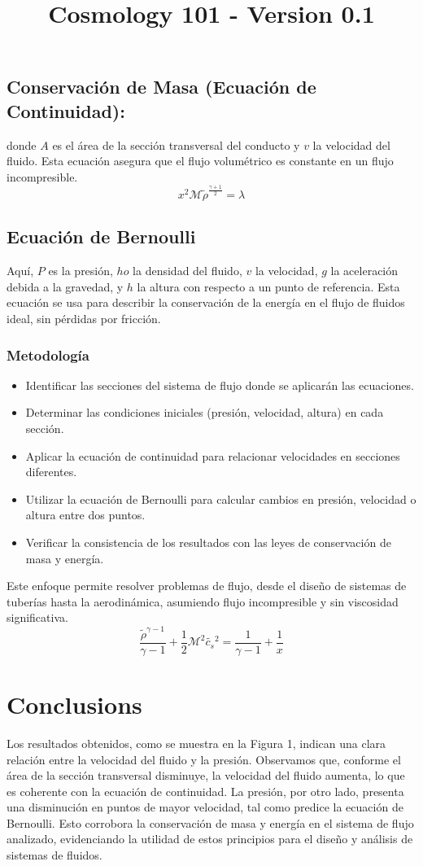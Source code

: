 \documentclass{article}\usepackage{graphicx} \usepackage{amsmath} \usepackage{colortbl}\title{Cosmology 101 - Version 0.1}
\begin{document}
\subsection{Conservación de Masa (Ecuación de Continuidad):}
donde $A$ es el área de la sección transversal del conducto y $v$ la velocidad del fluido. Esta ecuación asegura que el flujo volumétrico es constante en un flujo incompresible.\begin{equation}x^2 \mathcal{M} \tilde{\rho }^{\frac{\gamma +1}{2}}=\lambda\label{ber1}\end{equation}\subsection{Ecuación de Bernoulli}
Aquí, $P$ es la presión, $
ho$ la densidad del fluido, $v$ la velocidad, $g$ la aceleración debida a la gravedad, y $h$ la altura con respecto a un punto de referencia. Esta ecuación se usa para describir la conservación de la energía en el flujo de fluidos ideal, sin pérdidas por fricción.
\subsubsection{Metodología}
\begin{itemize}
\item Identificar las secciones del sistema de flujo donde se aplicarán las ecuaciones.
\item Determinar las condiciones iniciales (presión, velocidad, altura) en cada sección.
\item Aplicar la ecuación de continuidad para relacionar velocidades en secciones diferentes.
\item Utilizar la ecuación de Bernoulli para calcular cambios en presión, velocidad o altura entre dos puntos.
\item Verificar la consistencia de los resultados con las leyes de conservación de masa y energía.
\end{itemize}

Este enfoque permite resolver problemas de flujo, desde el diseño de sistemas de tuberías hasta la aerodinámica, asumiendo flujo incompresible y sin viscosidad significativa.\begin{equation}\frac{\tilde{\rho }^{\gamma -1}}{\gamma -1}+\frac{1}{2} \mathcal{M}^2 \tilde{c_s}{}^2=\frac{1}{\gamma -1}+\frac{1}{x}\label{ber2}\end{equation}\section{Conclusions}
Los resultados obtenidos, como se muestra en la Figura 1, indican una clara relación entre la velocidad del fluido y la presión. Observamos que, conforme el área de la sección transversal disminuye, la velocidad del fluido aumenta, lo que es coherente con la ecuación de continuidad. La presión, por otro lado, presenta una disminución en puntos de mayor velocidad, tal como predice la ecuación de Bernoulli. Esto corrobora la conservación de masa y energía en el sistema de flujo analizado, evidenciando la utilidad de estos principios para el diseño y análisis de sistemas de fluidos.
\end{document}
